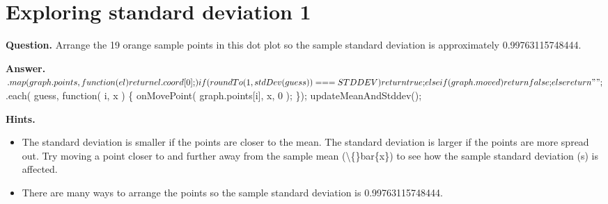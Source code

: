 \documentclass{article}
\begin{document}
\section*{Exploring standard deviation 1}
\textbf{Question.} Arrange the 19 orange sample points in this dot plot so the
                        sample standard deviation is approximately 0.99763115748444.

\textbf{Answer.} $.map( graph.points, function( el ) { return el.coord[0]; } )
                    
                        if ( roundTo( 1, stdDev( guess ) ) === STDDEV ) {
                            return true;
                        } else if ( graph.moved ) {
                            return false;
                        } else {
                            return "";
                        }
                    
                    
                        $.each( guess, function( i, x ) \{
                            onMovePoint( graph.points[i], x, 0 );
                        \});
                        updateMeanAndStddev();

\textbf{Hints.}
\begin{itemize}
  \item The standard deviation is smaller if the points are closer to the mean.
                        The standard deviation is larger if the points are more spread out.
                        Try moving a point closer to and further away from the
                        sample mean (\textbackslash\{\}bar\{x\}) to see how the
                        sample standard deviation (s) is affected.
  \item There are many ways to arrange the points so the sample standard deviation is
                        0.99763115748444.
\end{itemize}
\end{document}
